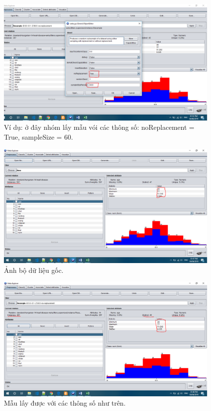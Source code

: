 \begin{itemize}
\begin{figure}[H]
\centering
\includegraphics[width=0.98\textwidth]{6/3.png}
\caption{Ví dụ: ở đây nhóm lấy mẫu vói các thông số: noReplacement = True, sampleSize = 60.}
\end{figure}
\begin{figure}[H]
\centering
\includegraphics[width=0.98\textwidth]{6/4.png}
\caption{Ảnh bộ dữ liệu gốc.}
\end{figure}
\begin{figure}[H]
\centering
\includegraphics[width=0.98\textwidth]{6/5.png}
\caption{Mẫu lấy được với các thông số như trên.}
\end{figure}
\end{itemize}

